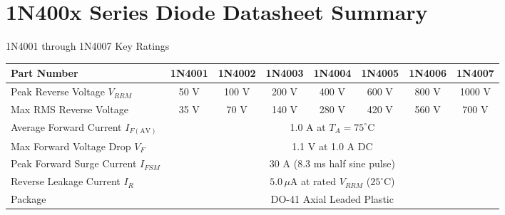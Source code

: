 \section{1N400x Series Diode Datasheet Summary}
\begin{formulabox}{1N4001 through 1N4007 Key Ratings}
\begin{center}
\begin{tabular}{lccccccc}
\toprule
\textbf{Part Number} & \textbf{1N4001} & \textbf{1N4002} & \textbf{1N4003} & \textbf{1N4004} & \textbf{1N4005} & \textbf{1N4006} & \textbf{1N4007} \\
\midrule
Peak Reverse Voltage $V_{RRM}$ & 50 V & 100 V & 200 V & 400 V & 600 V & 800 V & 1000 V \\
Max RMS Reverse Voltage & 35 V & 70 V & 140 V & 280 V & 420 V & 560 V & 700 V \\
Average Forward Current $I_{F(\mathrm{AV})}$ & \multicolumn{7}{c}{1.0 A at $T_A = 75^\circ\mathrm{C}$} \\
Max Forward Voltage Drop $V_F$ & \multicolumn{7}{c}{1.1 V at 1.0 A DC} \\
Peak Forward Surge Current $I_{FSM}$ & \multicolumn{7}{c}{30 A (8.3 ms half sine pulse)} \\
Reverse Leakage Current $I_R$ & \multicolumn{7}{c}{$5.0\,\mu\mathrm{A}$ at rated $V_{RRM}$ ($25^\circ\mathrm{C}$)} \\
Package & \multicolumn{7}{c}{DO-41 Axial Leaded Plastic} \\
\bottomrule
\end{tabular}
\end{center}
\end{formulabox}
